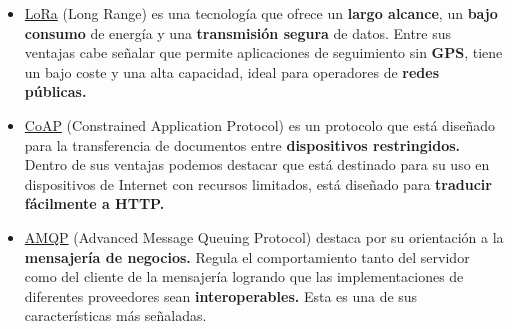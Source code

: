 \begin{itemize}  
\item \href{https://www.lora-alliance.org/What-Is-LoRa/Technology}{LoRa} (Long Range) es una tecnología que ofrece un \textbf{largo alcance}, un \textbf{bajo consumo} de energía y una \textbf{transmisión segura} de datos. Entre sus ventajas cabe señalar que permite aplicaciones de seguimiento sin \textbf{GPS}, tiene un bajo coste y una alta capacidad, ideal para operadores de \textbf{redes públicas.}
\item \href{https://en.wikipedia.org/wiki/Constrained_Application_Protocol}{CoAP} (Constrained Application Protocol) es un protocolo que está diseñado para la transferencia de documentos entre \textbf{dispositivos restringidos.} Dentro de sus ventajas podemos destacar que está destinado para su uso en dispositivos de Internet con recursos limitados, está diseñado para \textbf{traducir fácilmente a HTTP.}
\item \href{https://www.amqp.org/}{AMQP} (Advanced Message Queuing Protocol) destaca por su orientación a la \textbf{mensajería de negocios.} Regula el comportamiento tanto del servidor como del cliente de la mensajería logrando que las implementaciones de diferentes proveedores sean \textbf{interoperables.} Esta es una de sus características más señaladas.
\end{itemize}
